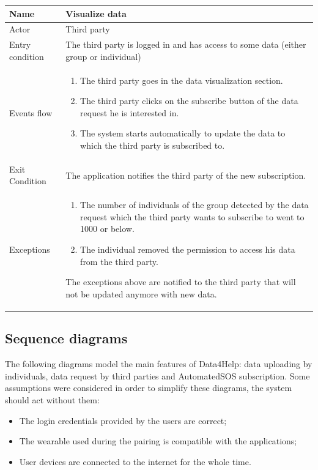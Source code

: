 \begin{table}[H]
\centering
\begin{tabular}{|l|p{11cm}|}
    \hline
    Name & Visualize data
    \\ \hline
    Actor & Third party
    \\ \hline 
    Entry condition & The third party is logged in and has access to some data (either group or individual)
        \\ \hline
    Events flow &
    \begin{enumerate}
    \item The third party goes in the data visualization section.
	\item The third party clicks on the subscribe button of the data request he is interested in.
	\item The system starts automatically to update the data to which the third party is subscribed to.
    \end{enumerate}
     \\ \hline
     Exit Condition & The application notifies the third party of the new subscription.
     \\
    \hline
    Exceptions &
        \begin{enumerate}
    \item The number of individuals of the group detected by the data request which the third party wants to subscribe to went to 1000 or below.
    \item The individual removed the permission to access his data from the third party.
\end{enumerate}  
 The exceptions above are notified to the third party that will not be updated anymore with new data.
  \\
    \hline
\end{tabular}
\end{table}



\subsection{Sequence diagrams}
The following diagrams model the main features of Data4Help: data uploading by individuals, data request by third parties and AutomatedSOS subscription.
Some assumptions were considered in order to simplify these diagrams, the system should act without them:
\begin{itemize}
\item The login credentials provided by the users are correct;
\item The wearable used during the pairing is compatible with the applications;
\item User devices are connected to the internet for the whole time.
\end{itemize}





